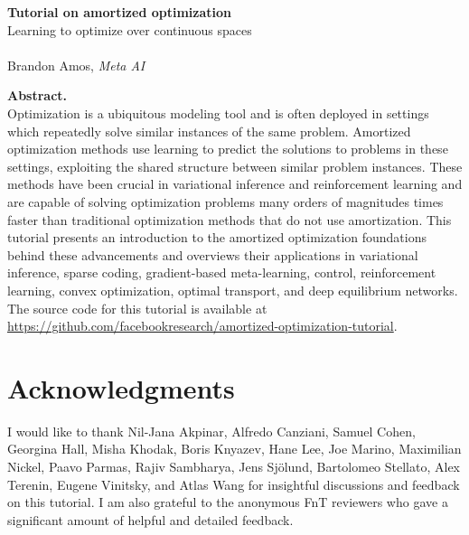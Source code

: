 \documentclass[oneside,11pt]{book}
\begin{document}
\begin{titlepage}
\thispagestyle{empty}
\begin{center}
\textbf{\Large Tutorial on amortized optimization} \\
{\large Learning to optimize over continuous spaces} \\~\\
Brandon Amos, \emph{Meta AI}
\end{center}

\vspace{0.9cm}
\noindent\textbf{Abstract.} \\
Optimization is a ubiquitous modeling tool and is often
deployed in settings which repeatedly solve similar
instances of the same problem.
Amortized optimization methods use learning to predict the solutions to
problems in these settings, exploiting the shared structure
between similar problem instances.
These methods have been crucial in variational inference
and reinforcement learning and are capable of solving
optimization problems many orders of magnitudes times faster
than traditional optimization methods that do not use amortization.
This tutorial presents an introduction to the amortized optimization
foundations behind these advancements and overviews
their applications in variational inference, sparse coding,
gradient-based meta-learning, control, reinforcement learning,
convex optimization, optimal transport, and deep equilibrium networks.
The source code for this tutorial is available at
{\footnotesize\url{https://github.com/facebookresearch/amortized-optimization-tutorial}}.
\end{titlepage}

\setcounter{tocdepth}{1}
\tableofcontents







\newpage
\section*{Acknowledgments}
I would like to thank
Nil-Jana Akpinar,
Alfredo Canziani,
Samuel Cohen,
Georgina Hall,
Misha Khodak,
Boris Knyazev,
Hane Lee,
Joe Marino,
Maximilian Nickel,
Paavo Parmas,
Rajiv Sambharya,
Jens Sj\"olund,
Bartolomeo Stellato,
Alex Terenin,
Eugene Vinitsky,
and
Atlas Wang
for insightful discussions
and feedback on this tutorial.
I am also grateful to the anonymous FnT reviewers
who gave a significant amount of helpful and
detailed feedback.

{\footnotesize}
\end{document}
